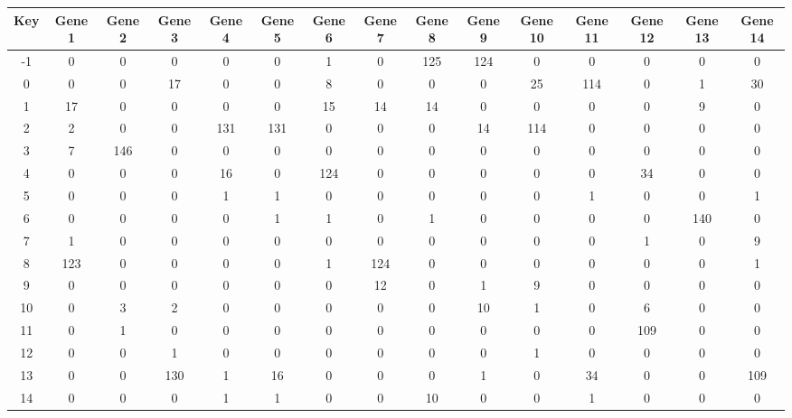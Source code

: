 \begin{tabular}{|c|c|c|c|c|c|c|c|c|c|c|c|c|c|c|}
\hline
Key & Gene 1 & Gene 2 & Gene 3 & Gene 4 & Gene 5 & Gene 6 & Gene 7 & Gene 8 & Gene 9 & Gene 10 & Gene 11 & Gene 12 & Gene 13 & Gene 14 \\
\hline
-1 & 0 & 0 & 0 & 0 & 0 & 1 & 0 & 125 & 124 & 0 & 0 & 0 & 0 & 0 \\
0 & 0 & 0 & 17 & 0 & 0 & 8 & 0 & 0 & 0 & 25 & 114 & 0 & 1 & 30 \\
1 & 17 & 0 & 0 & 0 & 0 & 15 & 14 & 14 & 0 & 0 & 0 & 0 & 9 & 0 \\
2 & 2 & 0 & 0 & 131 & 131 & 0 & 0 & 0 & 14 & 114 & 0 & 0 & 0 & 0 \\
3 & 7 & 146 & 0 & 0 & 0 & 0 & 0 & 0 & 0 & 0 & 0 & 0 & 0 & 0 \\
4 & 0 & 0 & 0 & 16 & 0 & 124 & 0 & 0 & 0 & 0 & 0 & 34 & 0 & 0 \\
5 & 0 & 0 & 0 & 1 & 1 & 0 & 0 & 0 & 0 & 0 & 1 & 0 & 0 & 1 \\
6 & 0 & 0 & 0 & 0 & 1 & 1 & 0 & 1 & 0 & 0 & 0 & 0 & 140 & 0 \\
7 & 1 & 0 & 0 & 0 & 0 & 0 & 0 & 0 & 0 & 0 & 0 & 1 & 0 & 9 \\
8 & 123 & 0 & 0 & 0 & 0 & 1 & 124 & 0 & 0 & 0 & 0 & 0 & 0 & 1 \\
9 & 0 & 0 & 0 & 0 & 0 & 0 & 12 & 0 & 1 & 9 & 0 & 0 & 0 & 0 \\
10 & 0 & 3 & 2 & 0 & 0 & 0 & 0 & 0 & 10 & 1 & 0 & 6 & 0 & 0 \\
11 & 0 & 1 & 0 & 0 & 0 & 0 & 0 & 0 & 0 & 0 & 0 & 109 & 0 & 0 \\
12 & 0 & 0 & 1 & 0 & 0 & 0 & 0 & 0 & 0 & 1 & 0 & 0 & 0 & 0 \\
13 & 0 & 0 & 130 & 1 & 16 & 0 & 0 & 0 & 1 & 0 & 34 & 0 & 0 & 109 \\
14 & 0 & 0 & 0 & 1 & 1 & 0 & 0 & 10 & 0 & 0 & 1 & 0 & 0 & 0 \\
\hline
\end{tabular}